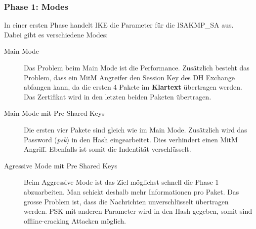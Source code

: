 \subsubsection{Phase 1: Modes}
In einer ersten Phase handelt IKE die Parameter für die ISAKMP\_SA aus. Dabei gibt es verschiedene Modes:
\begin{description}
	\item[Main Mode] Das Problem beim Main Mode ist die Performance. Zusätzlich besteht das Problem, dass ein MitM Angreifer den Session Key des DH Exchange abfangen kann, da die ersten 4 Pakete im \textbf{Klartext} übertragen werden. Das Zertifikat wird in den letzten beiden Paketen übertragen.
	\item[Main Mode mit Pre Shared Keys] Die ersten vier Pakete sind gleich wie im Main Mode. Zusätzlich wird das Password (\textit{psk}) in den Hash eingearbeitet. Dies verhindert einen MitM Angriff. Ebenfalls ist somit die Indentität verschlüsselt.
	\item[Agressive Mode mit Pre Shared Keys] Beim Aggressive Mode ist das Ziel möglichst schnell die Phase 1 abzuarbeiten. Man schickt deshalb mehr Informationen pro Paket. Das grosse Problem ist, dass die Nachrichten unverschlüsselt übertragen werden. PSK mit anderen Parameter wird in den Hash gegeben, somit sind offline-cracking Attacken möglich.
\end{description}

